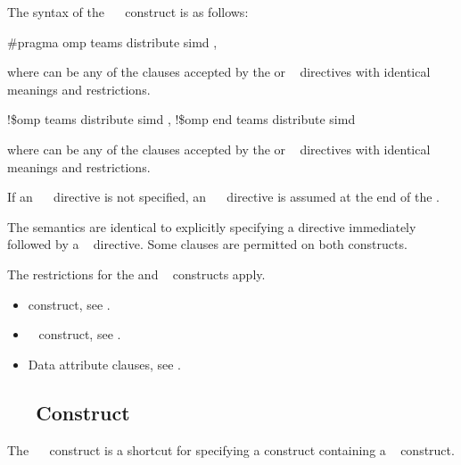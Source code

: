 \syntax
The syntax of the ~~ construct is as follows:

\ccppspecificstart
\begin{boxedcode}
\#pragma omp teams distribute simd \plc{[clause[ [},\plc{] clause] ... ]}
\end{boxedcode}

where  can be any of the clauses accepted by the  or ~ 
directives with identical meanings and restrictions.
\ccppspecificend

\fortranspecificstart
\begin{boxedcode}
!\$omp teams distribute simd \plc{[clause[ [},\plc{] clause] ... ]}
\plc{[}!\$omp end teams distribute simd\plc{]}
\end{boxedcode}

where  can be any of the clauses accepted by the  or ~ 
directives with identical meanings and restrictions.

If an ~~ directive is not specified, an 
~~ directive is assumed at the end of the .
\fortranspecificend

\descr
The semantics are identical to explicitly specifying a  directive immediately 
followed by a ~ directive. Some clauses are permitted on both constructs.

\restrictions
The restrictions for the  and ~ constructs apply.

\crossreferences
\begin{itemize}
\item {} construct, see 
.

\item {}~ construct, see 
.

\item Data attribute clauses, see 
.
\end{itemize}











\subsection{~~ Construct}
\label{subsec:target teams distribute construct}
\summary
The ~~ construct is a shortcut for specifying a  construct 
containing a ~ construct.

